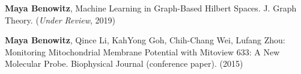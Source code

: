 


\begin{cventries}

\cventry
{} %
{} %
{} %
{} %
{ %
\begin{cvitems}
\item {\textbf{Maya Benowitz}, Machine Learning in Graph-Based Hilbert Spaces. J. Graph Theory. (\textit{Under Review}, 2019)}
\item {\textbf{Maya Benowitz}, Qince Li, KahYong Goh, Chih-Chang Wei, Lufang Zhou: Monitoring Mitochondrial Membrane Potential with Mitoview 633: A New Molecular Probe. Biophysical Journal (conference paper). (2015)}
\end{cvitems} 
}




\end{cventries}